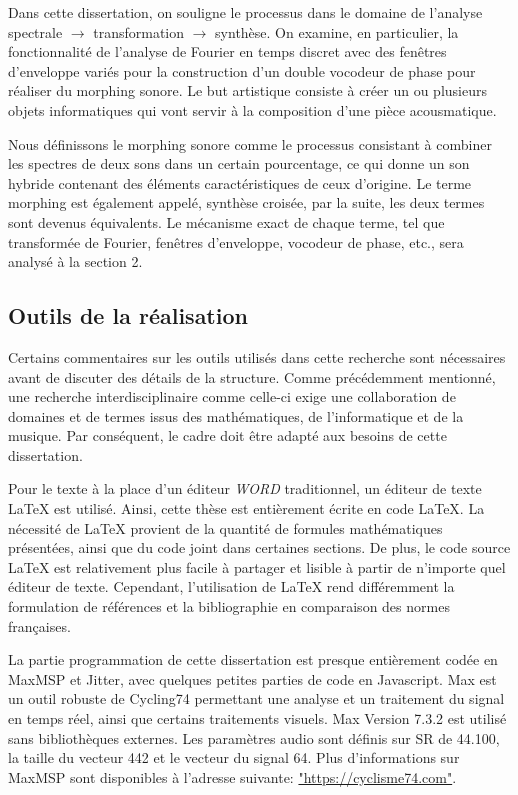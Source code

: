 Dans cette dissertation, on souligne le processus dans le domaine de l'analyse spectrale $\to$ transformation $\to$ synthèse. On examine, en particulier, la fonctionnalité de l'analyse de Fourier en temps discret avec des fenêtres d'enveloppe variés pour la construction d'un double vocodeur de phase pour réaliser du morphing sonore. Le but artistique consiste à créer un ou plusieurs objets informatiques qui vont servir à la composition d'une pièce acousmatique.

Nous définissons le morphing sonore comme le processus consistant à combiner les spectres de deux sons dans un certain pourcentage, ce qui donne un son hybride contenant des éléments caractéristiques de ceux d'origine. Le terme morphing est également appelé, synthèse croisée, par la suite, les deux termes sont devenus équivalents. Le mécanisme exact de chaque terme, tel que transformée de Fourier, fenêtres d’enveloppe, vocodeur de phase, etc., sera analysé à la section 2.

\subsection{Outils de la réalisation}

Certains commentaires sur les outils utilisés dans cette recherche sont nécessaires avant de discuter des détails de la structure. Comme précédemment mentionné, une recherche interdisciplinaire comme celle-ci exige une collaboration de domaines et de termes issus des mathématiques, de l'informatique et de la musique. Par conséquent, le cadre doit être adapté aux besoins de cette dissertation.

Pour le texte à la place d'un éditeur \textit{WORD} traditionnel, un éditeur de texte \LaTeX{} est utilisé. Ainsi, cette thèse est entièrement écrite en code \LaTeX{}. La nécessité de \LaTeX{} provient de la quantité de formules mathématiques présentées, ainsi que du code joint dans certaines sections. De plus, le code source \LaTeX{} est relativement plus facile à partager et lisible à partir de n’importe quel éditeur de texte. Cependant, l’utilisation de \LaTeX{} rend différemment la formulation de références et la bibliographie en comparaison des normes françaises.

La partie programmation de cette dissertation est presque entièrement codée en MaxMSP et Jitter, avec quelques petites parties de code en Javascript. Max est un outil robuste de Cycling74 permettant une analyse et un traitement du signal en temps réel, ainsi que certains traitements visuels. Max Version 7.3.2 est utilisé sans bibliothèques externes. Les paramètres audio sont définis sur SR de 44.100, la taille du vecteur 442 et le vecteur du signal 64. Plus d’informations sur MaxMSP sont disponibles à l’adresse suivante: \href{https://cycling74.com/products/max/}{"https://cyclisme74.com"}.

